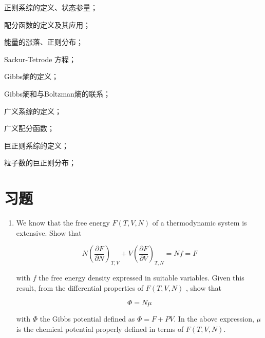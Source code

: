 \begin{review}
       \item 正则系综的定义、状态参量；
       \item 配分函数的定义及其应用；
       \item 能量的涨落、正则分布；
       \item Sackur‐Tetrode 方程；
       \item Gibbs熵的定义；
       \item Gibbs熵和与Boltzman熵的联系；
       \item 广义系综的定义；
       \item 广义配分函数；
       \item 巨正则系综的定义；
       \item 粒子数的巨正则分布；
\end{review}
\section{习题} %
\label{sec:习题2}
\begin{enumerate}
       \item We know that the free energy  $F(T, V, N)$  of a thermodynamic system is extensive. Show that

       \[N\left(\frac{\partial F}{\partial N}\right)_{T, V}+V\left(\frac{\partial F}{\partial V}\right)_{T, N}=N f=F\]
       
       with  $f$  the free energy density expressed in suitable variables. Given this result, from the differential properties of  $F(T, V, N)$ , show that
       
       \[\Phi=N \mu\]
       
       with  $\Phi$  the Gibbs potential defined as $\Phi=F+P V $. In the above expression, $ \mu $ is the chemical potential properly defined in terms of $ F(T, V, N) $.
\end{enumerate}
